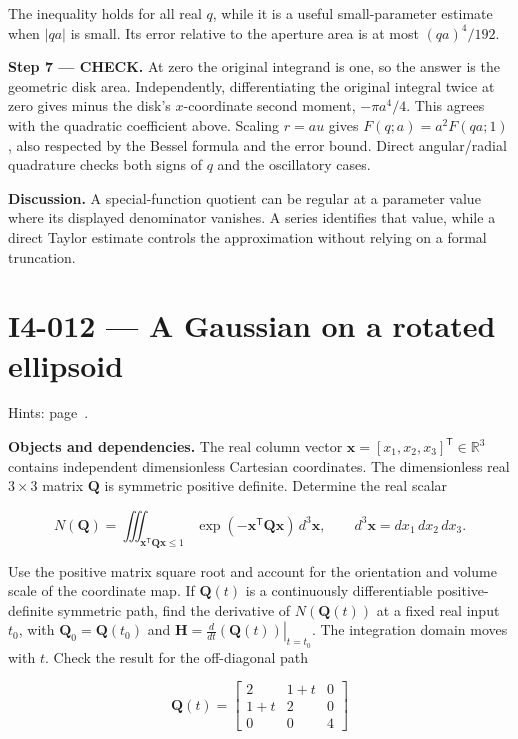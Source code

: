 \documentclass[11pt,oneside,openany]{book}
\begin{document}
The inequality holds for all real \(q\), while it is a useful small-parameter estimate when \(|qa|\) is small. Its error relative to the aperture area is at most \((qa)^4/192\).

\endgroup
\textbf{Step 7 --- CHECK.} At zero the original integrand is one, so the answer is the geometric disk area. Independently, differentiating the original integral twice at zero gives minus the disk's \(x\)-coordinate second moment, \(-\pi a^4/4\). This agrees with the quadratic coefficient above. Scaling \(r=a u\) gives \(F(q;a)=a^2F(qa;1)\), also respected by the Bessel formula and the error bound. Direct angular/radial quadrature checks both signs of \(q\) and the oscillatory cases.

\textbf{Discussion.} A special-function quotient can be regular at a parameter value where its displayed denominator vanishes. A series identifies that value, while a direct Taylor estimate controls the approximation without relying on a formal truncation.
\clearpage
\section{I4-012 --- A Gaussian on a rotated ellipsoid}
\label{problem:I4-012}
{\small Hints: page~\pageref{hints:I4-012}.}\par\medskip

\textbf{Objects and dependencies.} The real column vector \(\mathbf x=[x_1,x_2,x_3]^{\mathsf T}\in\mathbb R^3\) contains independent dimensionless Cartesian coordinates. The dimensionless real \(3\times3\) matrix \(\mathbf Q\) is symmetric positive definite. Determine the real scalar

\[
N(\mathbf Q)=\iiint_{\mathbf x^{\mathsf T}\mathbf Q\mathbf x\le1}
\exp(-\mathbf x^{\mathsf T}\mathbf Q\mathbf x)\,d^3\mathbf x,
\qquad d^3\mathbf x=dx_1\,dx_2\,dx_3.
\]

Use the positive matrix square root and account for the orientation and volume scale of the coordinate map. If \(\mathbf Q(t)\) is a continuously differentiable positive-definite symmetric path, find the derivative of \(N(\mathbf Q(t))\) at a fixed real input \(t_0\), with \(\mathbf Q_0=\mathbf Q(t_0)\) and \(\mathbf H=\left.\frac{d}{dt}(\mathbf Q(t))\right|_{t=t_0}\). The integration domain moves with \(t\). Check the result for the off-diagonal path

\[
\mathbf Q(t)=\begin{bmatrix}2&1+t&0\\1+t&2&0\\0&0&4\end{bmatrix}
\]
\end{document}
